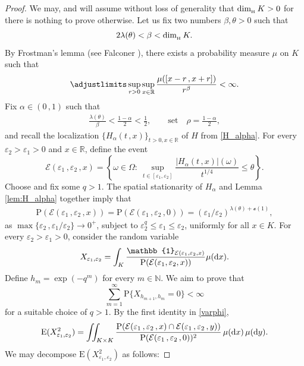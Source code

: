\documentclass[reqno]{amsart}
\DeclareMathOperator{\dimh}{dim_{_{\rm H}}}
\newcommand{\<}{\langle}
\renewcommand{\>}{\rangle}
\newcommand{\N}{\mathbb{N}}
\newcommand{\R}{\mathbb{R}}
\renewcommand{\P}{\mathrm{P}}
\newcommand{\E}{\mathrm{E}}
\newcommand{\1}{\mathbb{1}}
\renewcommand{\d}{{\rm d}}
\renewcommand{\le}{\leqslant}
\theoremstyle{definition}
\numberwithin{equation}{section}
\begin{document}
\begin{proof}
	We may, and will assume without loss of generality that $\dimh K>0$
	for there is nothing to prove otherwise. Let us fix two numbers
	$\beta,\theta>0$ such that
	\[
		2\lambda(\theta) < \beta < \dimh K.
	\]
	By Frostman's lemma (see Falconer \cite{Falconer}), there exists 
	a probability measure $\mu$ on $K$ such that
	\begin{align}\label{Frostman:meas}
		\adjustlimits \sup_{r>0}\sup_{x\in\R}
		\frac{\mu([x-r\,, x+r])}{r^\beta}<\infty.
	\end{align}
	Fix $\alpha \in (0\,,1)$  such that
	\begin{align}\label{alpha:rho}
		\frac{\lambda(\theta)}{\beta} < \frac{1-\alpha}{2} < \frac12,
		\qquad\text{set}\quad \rho = \frac{1-\alpha}{2},
	\end{align}
	and recall the localization $\{H_\alpha(t\,,x)\}_{t>0,x \in \R}$ 
	of $H$ from \eqref{H_alpha}.
	For every $\varepsilon_2>\varepsilon_1 > 0$ and $x \in \R$, define the event
	\[
		\mathcal{E}(\varepsilon_1\,,\varepsilon_2\,,x)  =  
		\left\{  \omega\in\Omega:\
		\sup_{t \in [\varepsilon_1,\varepsilon_2]} 
		\frac{|H_\alpha(t\,,x)|(\omega)}{t^{1/4}} \le \theta \right\}.
	\]
	Choose and fix some $q>1$.
	The spatial stationarity of $H_\alpha$ and Lemma \ref{lem:H_alpha} together
	imply that
	\begin{align}\label{varphi}
		\P(\mathcal{E}(\varepsilon_1\,,\varepsilon_2\,,x))
		= \P(\mathcal{E}(\varepsilon_1\,,\varepsilon_2\,,0)) = 
		(\varepsilon_1/\varepsilon_2)^{\lambda(\theta)+\mathscr{o}(1)},
	\end{align}
	as $\max\{\varepsilon_2\,,\varepsilon_1/\varepsilon_2\} \to 0^+$, 
	subject to $\varepsilon_2^q \le \varepsilon_1 \le \varepsilon_2$, uniformly for all $x \in K$.
	For every $\varepsilon_2>\varepsilon_1>0$, consider the random variable
	\[
		X_{\varepsilon_1,\varepsilon_2}  =  
		\int_K \frac{\1_{\mathcal{E}(\varepsilon_1,\varepsilon_2,x)}}{%
		\P(\mathcal{E}(\varepsilon_1,\varepsilon_2,x))} \mu( \d x).
	\]
	Define $h_m = \exp(-q^m)$ for every $m \in \N$. 
	We aim to prove that 
	\[
		\sum_{m=1}^\infty \P\{ X_{h_{m+1}, h_m} = 0\} < \infty
	\]
	for a suitable choice of $q>1$.
	By the first identity in \eqref{varphi},
	\[
		\E(X_{\varepsilon_1,\varepsilon_2}^2)
		= \iint_{K\times K} \frac{\P(\mathcal{E}(%
		\varepsilon_1\,,\varepsilon_2\,,x) \cap \mathcal{E}(%
		\varepsilon_1\,,\varepsilon_2\,,y))}{\P(\mathcal{E}(%
		\varepsilon_1\,,\varepsilon_2\,,0))^2}\, \mu(\d x)\, \mu(\d y).
	\]
	We may decompose $\E(X_{\varepsilon_1,\varepsilon_2}^2)$ as follows:

\end{proof}
\end{document}
